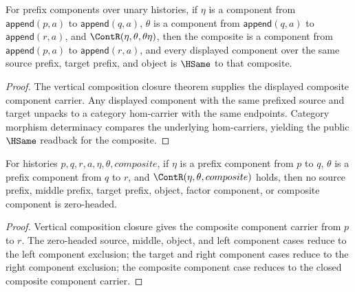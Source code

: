 \begin{theorem}
\label{thm:nattrans-prefix-component-carrier-vert-comp-public-readback}
For prefix components over unary histories, if \(\eta\) is a component from
\(\mathsf{append}(p,a)\) to \(\mathsf{append}(q,a)\), \(\theta\) is a component
from \(\mathsf{append}(q,a)\) to \(\mathsf{append}(r,a)\), and
\(\ContR(\eta,\theta,\theta\eta)\), then the composite is a component from
\(\mathsf{append}(p,a)\) to \(\mathsf{append}(r,a)\), and every displayed
component over the same source prefix, target prefix, and object is \(\HSame\)
to that composite.
\end{theorem}
\begin{proof}
The vertical composition closure theorem supplies the displayed composite
component carrier. Any displayed component with the same prefixed source and
target unpacks to a category hom-carrier with the same endpoints. Category
morphism determinacy compares the underlying hom-carriers, yielding the public
\(\HSame\) readback for the composite.
\end{proof}

\begin{theorem}
\label{thm:nattrans-prefix-component-vert-comp-zero-headed-component-absurd}
For histories $p,q,r,a,\eta,\theta,composite$, if $\eta$ is a prefix component
from $p$ to $q$, $\theta$ is a prefix component from $q$ to $r$, and
$\ContR(\eta,\theta,composite)$ holds, then no source prefix, middle prefix,
target prefix, object, factor component, or composite component is zero-headed.
\end{theorem}
\begin{proof}
Vertical composition closure gives the composite component carrier from $p$ to
$r$. The zero-headed source, middle, object, and left component cases reduce to
the left component exclusion; the target and right component cases reduce to
the right component exclusion; the composite component case reduces to the
closed composite component carrier.
\end{proof}

